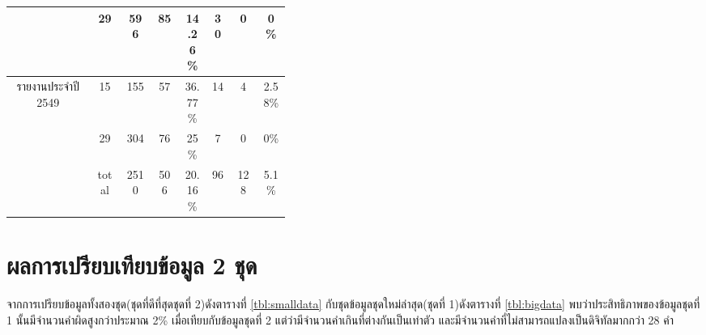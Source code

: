 \begin{table}[H]
\begin{tabular}{|c|c|c|p{0.1\linewidth}|p{0.1\linewidth}|c|p{0.1\linewidth}|p{0.1\linewidth}|}
                                                & 29                         & \multicolumn{1}{c|}{596 }      & \multicolumn{1}{c|}{85 }         & \multicolumn{1}{c|}{14.26\%} & \multicolumn{1}{c|}{30}     & \multicolumn{1}{c|}{0  }             & \multicolumn{1}{c|}{0\%    } \\ \hline
            \multirow{2}{*}{รายงานประจำปี 2549}   & 15                         & \multicolumn{1}{c|}{155 }      & \multicolumn{1}{c|}{57 }         & \multicolumn{1}{c|}{36.77\%} & \multicolumn{1}{c|}{14}     & \multicolumn{1}{c|}{4  }             & \multicolumn{1}{c|}{2.58\% } \\ \cline{2-8} 
                                                & 29                         & \multicolumn{1}{c|}{304 }      & \multicolumn{1}{c|}{76 }         & \multicolumn{1}{c|}{25\%   } & \multicolumn{1}{c|}{7 }     & \multicolumn{1}{c|}{0  }             & \multicolumn{1}{c|}{0\%    } \\ \hline
            \multicolumn{1}{|l|}{}              & \multicolumn{1}{c|}{total} & \multicolumn{1}{c|}{2510}      & \multicolumn{1}{c|}{506}         & \multicolumn{1}{c|}{20.16\%} & \multicolumn{1}{c|}{96}     & \multicolumn{1}{c|}{128}             & \multicolumn{1}{c|}{5.1\%  } \\ \hline
            \end{tabular}
            \end{table}

\section{ผลการเปรียบเทียบข้อมูล 2 ชุด}

จากการเปรียบข้อมูลทั้งสองชุด(ชุดที่ดีที่สุดชุดที่ 2)ดังตารางที่ \ref{tbl:smalldata} กับชุดข้อมูลชุดใหม่ล่าสุด(ชุดที่ 1)ดังตารางที่ \ref{tbl:bigdata} พบว่าประสิทธิภาพของข้อมูลชุดที่ 1 นั้นมีจำนวนคำผิดสูงกว่าประมาณ 2\% เมื่อเทียบกับข้อมูลชุดที่ 2 แต่ว่ามีจำนวนคำเกินที่ต่างกันเป็นเท่าตัว และมีจำนวนคำที่ไม่สามารถแปลงเป็นดิจิทัลมากกว่า 28 คำ

